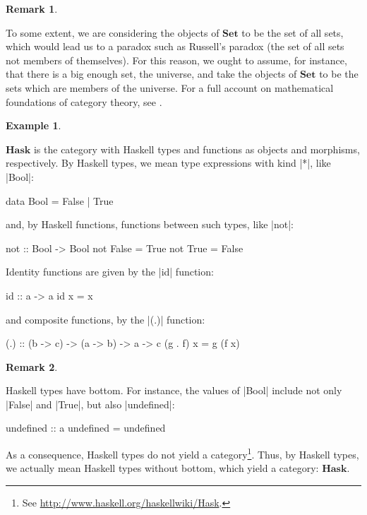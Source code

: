 \documentclass[11pt,letterpaper]{article}
\theoremstyle{definition}
\newtheorem{example}{Example}[section]
\newtheorem{remark}{Remark}[section]
\newcommand{\catbf}[1]{\ensuremath{\mathbf{#1}}\xspace}
\newcommand{\hask}{\catbf{Hask}}
\newcommand{\set}{\catbf{Set}}
\begin{document}
\begin{remark}
  \label{re:foundations}


  To some extent, we are considering the objects of \set to be the set
  of all sets, which would lead us to a paradox such as Russell's
  paradox (the set of all sets not members of themselves). For this
  reason, we ought to assume, for instance, that there is a big enough
  set, the universe, and take the objects of \set to be the sets which
  are members of the universe. For a full account on mathematical
  foundations of category theory, see
  \parencites[§~1.8]{awodey-2010}[§~I.6]{maclane-1998}.

\end{remark}

\begin{example}
  \label{ex:hask}


  \hask is the category with Haskell types and functions as objects
  and morphisms, respectively. By Haskell types, we mean type
  expressions with kind |*|, like |Bool|:
  \begin{code}
data Bool = False | True
  \end{code}
  and, by Haskell functions, functions between such types, like |not|:
  \begin{code}
not :: Bool -> Bool
not False = True
not True  = False
  \end{code}
  Identity functions are given by the |id| function:
  \begin{code}
id :: a -> a
id x = x
  \end{code}
  and composite functions, by the |(.)| function:
  \begin{code}
(.) :: (b -> c) -> (a -> b) -> a -> c
(g . f) x = g (f x)
  \end{code}

\end{example}

\begin{remark}
  \label{re:hask}


  Haskell types have bottom. For instance, the values of |Bool|
  include not only |False| and |True|, but also |undefined|:
  \begin{code}
undefined :: a
undefined = undefined
  \end{code}
  As a consequence, Haskell types do not yield a category\footnote{See
    \url{http://www.haskell.org/haskellwiki/Hask}.}. Thus, by Haskell
  types, we actually mean Haskell types without bottom, which yield a
  category: \hask.

\end{remark}
\end{document}
